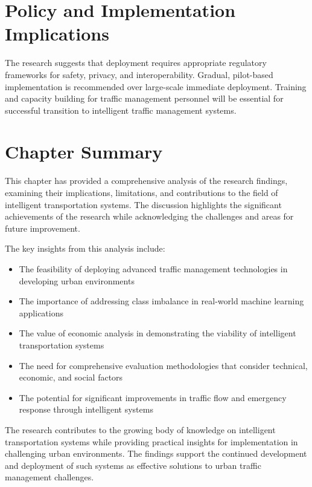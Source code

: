 \section{Policy and Implementation Implications}
\label{sec:policy_implications}

The research suggests that deployment requires appropriate regulatory frameworks for safety, privacy, and interoperability. Gradual, pilot-based implementation is recommended over large-scale immediate deployment. Training and capacity building for traffic management personnel will be essential for successful transition to intelligent traffic management systems.

\section{Chapter Summary}
\label{sec:discussion_summary}

This chapter has provided a comprehensive analysis of the research findings, examining their implications, limitations, and contributions to the field of intelligent transportation systems. The discussion highlights the significant achievements of the research while acknowledging the challenges and areas for future improvement.

The key insights from this analysis include:

\begin{itemize}
    \item The feasibility of deploying advanced traffic management technologies in developing urban environments
    \item The importance of addressing class imbalance in real-world machine learning applications
    \item The value of economic analysis in demonstrating the viability of intelligent transportation systems
    \item The need for comprehensive evaluation methodologies that consider technical, economic, and social factors
    \item The potential for significant improvements in traffic flow and emergency response through intelligent systems
\end{itemize}

The research contributes to the growing body of knowledge on intelligent transportation systems while providing practical insights for implementation in challenging urban environments. The findings support the continued development and deployment of such systems as effective solutions to urban traffic management challenges.